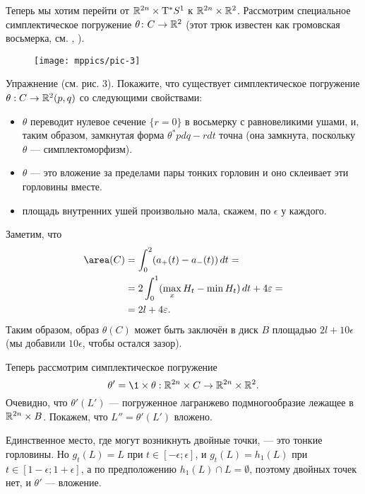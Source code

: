 Теперь мы хотим перейти от $\mathbb{R}^{2n} \times \mathrm{T}^{\ast} S^1$ к $\mathbb{R}^{2n} \times \mathbb{R}^2$.
Рассмотрим специальное симплектическое погружение $\theta\colon C \to \mathbb{R}^2$
(этот трюк известен как громовская восьмерка, см. \cite{G1}, \cite{AL}).

\begin{figure}[ht!]
\vskip-0mm
\centering
\texttt{[image: mppics/pic-3]}
\caption{}\label{pic-3}
\vskip0mm
\end{figure}

\begin{ex*}{Упражнение}
(см. рис. 3).
Покажите, что существует симплектическое погружение $\theta: C \to \mathbb{R}^2 (p, q)$ со следующими свойствами: 
\begin{itemize}
\item $\theta$ переводит нулевое сечение $\{r = 0\}$ в восьмерку с равновеликими ушами, и, таким образом, замкнутая форма $\theta^\ast pdq - rdt$ точна (она замкнута, поскольку $\theta$ — симплектоморфизм).
\item $\theta$ — это вложение за пределами пары тонких горловин и оно склеивает эти горловины вместе.
\item площадь внутренних ушей произвольно мала, скажем, по $\epsilon$ у каждого. 
\end{itemize}
\end{ex*}

Заметим, что 
\begin{align*}
\area (C) 
&= \int_0^2(a_+ (t) - a_- (t))\,dt = 
\\
&=2 \int_0^1(\max_x H_t - \min H_t) \,dt + 4\epsilon =
\\
&=2l + 4\epsilon.
\end{align*}
Таким образом, образ $\theta (C)$ может быть заключён в диск $B$
площадью $2l + 10\epsilon$ (мы добавили $10\epsilon$, чтобы остался зазор).

Теперь рассмотрим симплектическое погружение 
\[\theta' = \1 \times \theta: \RR^{2n} \times C \to \RR^{2n} \times \RR^2.\]
Очевидно, что $\theta' (L')$ — погруженное лагранжево подмногообразие лежащее в $\mathbb{R}^{2n} \times B$. 
Покажем, что $L'' = \theta' (L')$ вложено.

Единственное место, где могут возникнуть двойные точки, — это тонкие горловины.
Но $g_t (L) = L$ при $t \in [-\epsilon;\epsilon]$, 
и $g_t (L) = h_1 (L)$ при $t \in [1 - \epsilon;1 + \epsilon]$, а по предположению $h_1 (L) \cap L = \emptyset$, поэтому двойных точек нет, и $\theta'$ — вложение.

